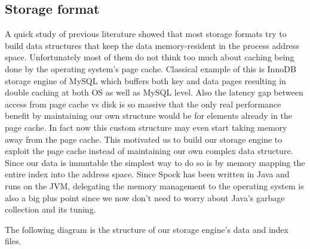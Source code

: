 \documentclass[twocolumn]{article}
\newcommand{\projectname}{Spock}
\begin{document}

\subsection{Storage format}
\label{sec:read_only:storage_format}

A quick study of previous literature showed that most storage formats try to build data structures that keep the data memory-resident in the process address space. Unfortunately most of them do not think too much about caching being done by the operating system's page cache. Classical example of this is InnoDB storage engine of MySQL which buffers both key and data pages resulting in double caching 
at both OS as well as MySQL level. Also the latency gap between access from page cache vs disk is so massive that the only real performance benefit by maintaining our own structure would be for elements already in the page cache. In fact now this custom structure may even start taking memory away from the page cache. This motivated us to build our storage engine to exploit the page cache instead of maintaining our own complex data structure. Since our data is immutable the simplest way to do so is by memory mapping the entire index into the address space. Since \projectname{} has been written in Java and runs on the JVM, delegating the memory management to the operating system is also a big plus point since we now don't need to worry about Java's garbage collection and its tuning.

The following diagram is the structure of our storage engine's data and index files. 
\end{document}
